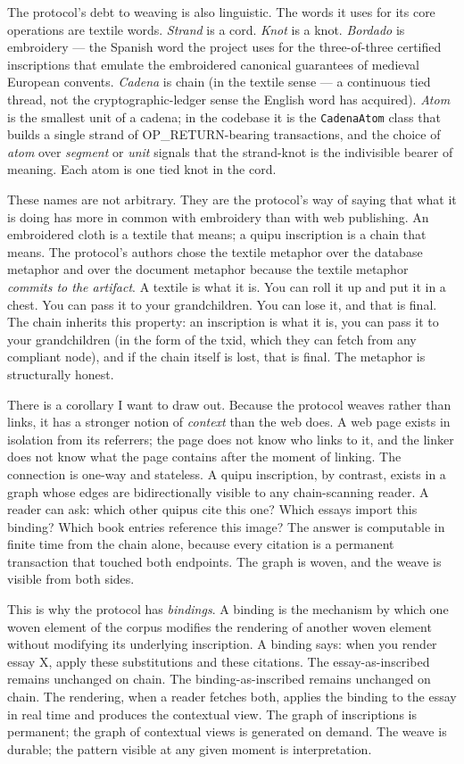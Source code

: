 \documentclass[11pt,openany]{book}
\begin{document}
The protocol's debt to weaving is also linguistic. The words it uses for its core operations are textile words. \emph{Strand} is a cord. \emph{Knot} is a knot. \emph{Bordado} is embroidery — the Spanish word the project uses for the three-of-three certified inscriptions that emulate the embroidered canonical guarantees of medieval European convents. \emph{Cadena} is chain (in the textile sense — a continuous tied thread, not the cryptographic-ledger sense the English word has acquired). \emph{Atom} is the smallest unit of a cadena; in the codebase it is the \texttt{CadenaAtom} class that builds a single strand of OP\_RETURN-bearing transactions, and the choice of \emph{atom} over \emph{segment} or \emph{unit} signals that the strand-knot is the indivisible bearer of meaning. Each atom is one tied knot in the cord.

These names are not arbitrary. They are the protocol's way of saying that what it is doing has more in common with embroidery than with web publishing. An embroidered cloth is a textile that means; a quipu inscription is a chain that means. The protocol's authors chose the textile metaphor over the database metaphor and over the document metaphor because the textile metaphor \emph{commits to the artifact}. A textile is what it is. You can roll it up and put it in a chest. You can pass it to your grandchildren. You can lose it, and that is final. The chain inherits this property: an inscription is what it is, you can pass it to your grandchildren (in the form of the txid, which they can fetch from any compliant node), and if the chain itself is lost, that is final. The metaphor is structurally honest.

There is a corollary I want to draw out. Because the protocol weaves rather than links, it has a stronger notion of \emph{context} than the web does. A web page exists in isolation from its referrers; the page does not know who links to it, and the linker does not know what the page contains after the moment of linking. The connection is one-way and stateless. A quipu inscription, by contrast, exists in a graph whose edges are bidirectionally visible to any chain-scanning reader. A reader can ask: which other quipus cite this one? Which essays import this binding? Which book entries reference this image? The answer is computable in finite time from the chain alone, because every citation is a permanent transaction that touched both endpoints. The graph is woven, and the weave is visible from both sides.

This is why the protocol has \emph{bindings}. A binding is the mechanism by which one woven element of the corpus modifies the rendering of another woven element without modifying its underlying inscription. A binding says: when you render essay X, apply these substitutions and these citations. The essay-as-inscribed remains unchanged on chain. The binding-as-inscribed remains unchanged on chain. The rendering, when a reader fetches both, applies the binding to the essay in real time and produces the contextual view. The graph of inscriptions is permanent; the graph of contextual views is generated on demand. The weave is durable; the pattern visible at any given moment is interpretation.
\end{document}
